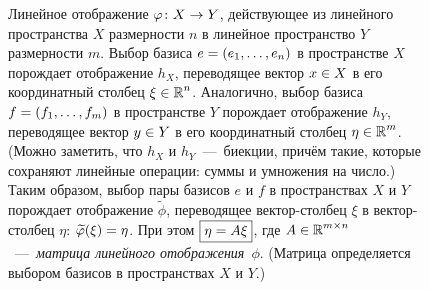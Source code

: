 \documentclass[a4paper,12pt]{article}
\begin{document}
  \begin{figure}[h]
    \centering
    
    
    \caption{Линейное отображение $\phi \hm\colon X \hm\to Y$, действующее из линейного пространства $X$ размерности $n$ в линейное пространство $Y$ размерности $m$.
      Выбор базиса $e \hm= (e_1, \ldots, e_n)$ в пространстве $X$ порождает отображение $h_X$, переводящее вектор $x \hm\in X$ в его координатный столбец $\xi \hm\in \RR^n$.
      Аналогично, выбор базиса $f \hm= (f_1, \ldots, f_m)$ в пространстве $Y$ порождает отображение $h_Y$, переводящее вектор $y \hm\in Y$ в его координатный столбец $\eta \hm\in \RR^m$.
      (Можно заметить, что $h_X$ и $h_Y$~---~биекции, причём такие, которые сохраняют линейные операции: суммы и умножения на число.)
      Таким образом, выбор пары базисов $e$ и $f$ в пространствах $X$ и $Y$ порождает отображение $\widetilde \phi$, переводящее вектор-столбец $\xi$ в вектор-столбец $\eta$: $\widetilde \phi(\xi) \hm= \eta$.
      При этом $\boxed{\eta \hm= A \xi}$, где $A \hm\in \RR^{m \times n}$~---~\emph{матрица линейного отображения}~$\phi$.
      (Матрица определяется выбором базисов в пространствах $X$ и $Y$.)
    }
    \label{fig:map-maps-map-to-map}
  \end{figure}
  
\end{document}
